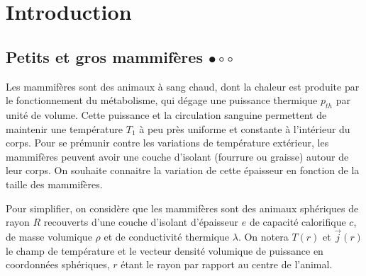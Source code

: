 \chapter*{Introduction}

\section*{Petits et gros mammifères $\bullet\circ\circ$}

Les mammifères sont des animaux à sang chaud, dont la chaleur est produite par le fonctionnement du métabolisme, qui dégage une puissance thermique $p_{th}$ par unité de volume. Cette puissance et la circulation sanguine permettent de maintenir une température $T_1$ à peu près uniforme et constante à l'intérieur du corps. Pour se prémunir contre les variations de température extérieur, les mammifères peuvent avoir une couche d'isolant (fourrure ou graisse) autour de leur corps. On souhaite connaitre la variation de cette épaisseur en fonction de la taille des mammifères. 

Pour simplifier, on considère que les mammifères sont des animaux sphériques de rayon $R$ recouverts d'une couche d'isolant d'épaisseur $e$ de capacité calorifique $c$, de masse volumique $\rho$ et de conductivité thermique $\lambda$. On notera $T(r)$ et $\vec{j}(r)$ le champ de température et le vecteur densité volumique de puissance en coordonnées sphériques, $r$ étant le rayon par rapport au centre de l'animal.